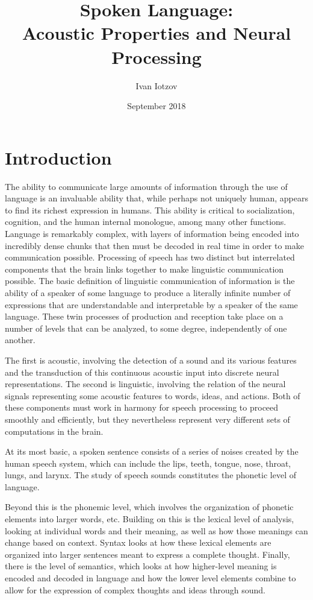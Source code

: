 \documentclass[titlepage]{article}
\title{Spoken Language:\\ Acoustic Properties and Neural Processing}
\author{Ivan Iotzov}
\date{September 2018}
\begin{document}

\maketitle


\section{Introduction} \label{intro}

  The ability to communicate large amounts of information through the use of
  language is an invaluable ability that, while perhaps not uniquely human,
  appears to find its richest expression in humans. This ability is critical to
  socialization, cognition, and the human internal monologue, among many other functions.
  Language is remarkably complex, with layers of information being encoded
  into incredibly dense chunks that then must be decoded in real time in order to make
  communication possible. Processing of speech has two distinct but interrelated
  components that the brain links together to make linguistic communication possible.
  The basic definition of linguistic communication of information is the ability
  of a speaker of some language to produce a literally infinite number of expressions
  that are understandable and interpretable by a speaker of the same language.
  These twin processes of production and reception take place on a number of levels
  that can be analyzed, to some degree, independently of one another.


  The first is acoustic, involving the detection of a sound and its various features
  and the transduction of this continuous acoustic input into discrete neural representations.
  The second is linguistic, involving the relation of the neural signals representing
  some acoustic features to words, ideas, and actions.
  Both of these components must work in harmony for speech processing to proceed
  smoothly and efficiently, but they nevertheless represent very different sets
  of computations in the brain.


  At its most basic, a spoken sentence consists of a series of noises
  created by the human speech system, which can include the lips, teeth, tongue,
  nose, throat, lungs, and larynx. The study of speech sounds constitutes the
  phonetic level of language.


  Beyond this is the phonemic level, which involves the organization
  of phonetic elements into larger words, etc. Building on this is the
  lexical level of analysis, looking at individual words and their meaning, as
  well as how those meanings can change based on context. Syntax looks at how these lexical
  elements are organized into larger sentences meant to express a complete thought. Finally,
  there is the level of semantics, which looks at how higher-level meaning is encoded
  and decoded in language and how the lower level elements combine to
  allow for the expression of complex thoughts and ideas through sound.
\end{document}
